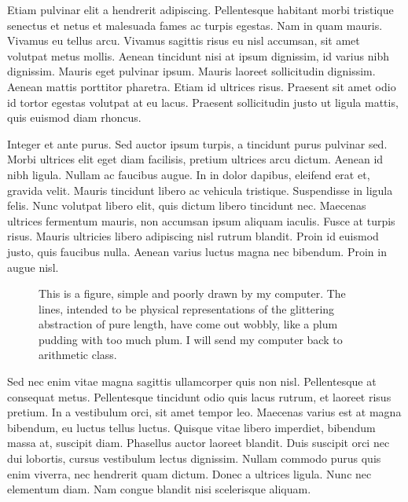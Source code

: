 \documentclass[9pt]{memoir}
\begin{document}
Etiam pulvinar elit a hendrerit adipiscing. Pellentesque habitant morbi tristique senectus et netus et malesuada fames ac turpis egestas. Nam in quam mauris. Vivamus eu tellus arcu. Vivamus sagittis risus eu nisl accumsan, sit amet volutpat metus mollis. Aenean tincidunt nisi at ipsum dignissim, id varius nibh dignissim. Mauris eget pulvinar ipsum. Mauris laoreet sollicitudin dignissim. Aenean mattis porttitor pharetra. Etiam id ultrices risus. Praesent sit amet odio id tortor egestas volutpat at eu lacus. Praesent sollicitudin justo ut ligula mattis, quis euismod diam rhoncus.

Integer et ante purus. Sed auctor ipsum turpis, a tincidunt purus pulvinar sed. Morbi ultrices elit eget diam facilisis, pretium ultrices arcu dictum. Aenean id nibh ligula. Nullam ac faucibus augue. In in dolor dapibus, eleifend erat et, gravida velit. Mauris tincidunt libero ac vehicula tristique. Suspendisse in ligula felis. Nunc volutpat libero elit, quis dictum libero tincidunt nec. Maecenas ultrices fermentum mauris, non accumsan ipsum aliquam iaculis. Fusce at turpis risus. Mauris ultricies libero adipiscing nisl rutrum blandit. Proin id euismod justo, quis faucibus nulla. Aenean varius luctus magna nec bibendum. Proin in augue nisl.

\begin{figure}
\begin{adjustwidth*}{-1in}{0pt}
\centering
{}
\end{adjustwidth*}
\caption{This is a figure, simple and poorly drawn by my computer. The lines, intended to be physical representations of the glittering abstraction of pure length, have come out wobbly, like a plum pudding with too much plum. I will send my computer back to arithmetic class.}
\label{fig:myfig}
\end{figure}

Sed nec enim vitae magna sagittis ullamcorper quis non nisl. Pellentesque at consequat metus. Pellentesque tincidunt odio quis lacus rutrum, et laoreet risus pretium. In a vestibulum orci, sit amet tempor leo. Maecenas varius est at magna bibendum, eu luctus tellus luctus. Quisque vitae libero imperdiet, bibendum massa at, suscipit diam. Phasellus auctor laoreet blandit. Duis suscipit orci nec dui lobortis, cursus vestibulum lectus dignissim. Nullam commodo purus quis enim viverra, nec hendrerit quam dictum. Donec a ultrices ligula. Nunc nec elementum diam. Nam congue blandit nisi scelerisque aliquam.
\end{document}
